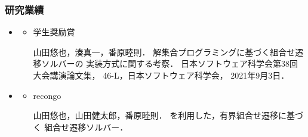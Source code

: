 \documentclass[dvipdfmx,11pt]{beamer}
\begin{document}
\begin{frame}\frametitle{研究業績}
  \begin{itemize}
    \item {}
    \begin{itemize}
      \item \alert{学生奨励賞}
      
      山田悠也，湊真一，番原睦則．
      解集合プログラミングに基づく組合せ遷移ソルバーの
      実装方式に関する考察．
      日本ソフトウェア科学会第38回大会講演論文集，
      46-L，日本ソフトウェア科学会，
      2021年9月3日．
    \end{itemize}
    \item {}
    \begin{itemize}
      \item \alert{recongo}
      
      山田悠也，山田健太郎，番原睦則．
      \clingo を利用した，有界組合せ遷移に基づく
      組合せ遷移ソルバー．
    \end{itemize}
  \end{itemize}
\end{frame}

\end{document}
